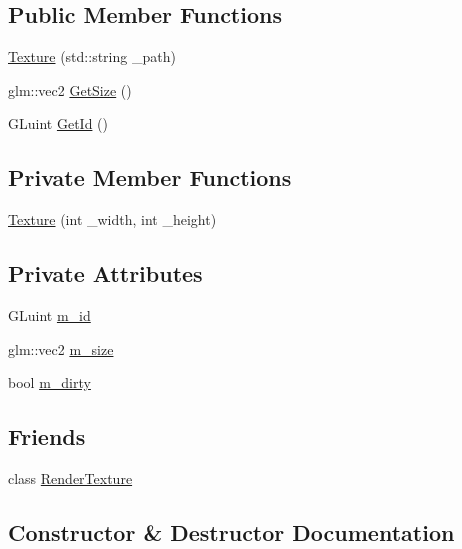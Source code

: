 \subsection*{Public Member Functions}
\begin{DoxyCompactItemize}
\item 
\mbox{\hyperlink{classharu_1_1_texture_a422b89c2d2b128a0ceb835c33134ec5f}{Texture}} (std\+::string \+\_\+path)
\item 
glm\+::vec2 \mbox{\hyperlink{classharu_1_1_texture_a8ca167a24b26121d9f4547c4a947693c}{Get\+Size}} ()
\item 
G\+Luint \mbox{\hyperlink{classharu_1_1_texture_aaf9f37304ea11cec8c9a4400850f314d}{Get\+Id}} ()
\end{DoxyCompactItemize}
\subsection*{Private Member Functions}
\begin{DoxyCompactItemize}
\item 
\mbox{\hyperlink{classharu_1_1_texture_a088277a42ce0ffa25e5df90856d2a70b}{Texture}} (int \+\_\+width, int \+\_\+height)
\end{DoxyCompactItemize}
\subsection*{Private Attributes}
\begin{DoxyCompactItemize}
\item 
G\+Luint \mbox{\hyperlink{classharu_1_1_texture_a7fe6446509151f52d72bb1c18a06cc7b}{m\+\_\+id}}
\item 
glm\+::vec2 \mbox{\hyperlink{classharu_1_1_texture_a8a15e433e4eef90ef52bb2243b91ef00}{m\+\_\+size}}
\item 
bool \mbox{\hyperlink{classharu_1_1_texture_aec50ecc4f9a591dd3b465e8ce5a3356e}{m\+\_\+dirty}}
\end{DoxyCompactItemize}
\subsection*{Friends}
\begin{DoxyCompactItemize}
\item 
class \mbox{\hyperlink{classharu_1_1_texture_a2548fc9744f5e43e0276d5627ca178de}{Render\+Texture}}
\end{DoxyCompactItemize}


\subsection{Constructor \& Destructor Documentation}
\mbox{\label{classharu_1_1_texture_a088277a42ce0ffa25e5df90856d2a70b}} 
